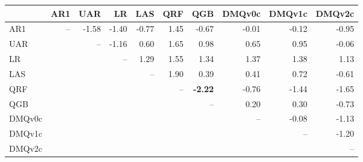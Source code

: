 \begin{tabular}{lrrrrrrrrr}
\toprule
 & AR1 & UAR & LR & LAS & QRF & QGB & DMQv0c & DMQv1c & DMQv2c \\
\midrule
AR1 & -- & -1.58 & -1.40 & -0.77 & 1.45 & -0.67 & -0.01 & -0.12 & -0.95 \\
UAR &  & -- & -1.16 & 0.60 & 1.65 & 0.98 & 0.65 & 0.95 & -0.06 \\
LR &  &  & -- & 1.29 & 1.55 & 1.34 & 1.37 & 1.38 & 1.13 \\
LAS &  &  &  & -- & 1.90 & 0.39 & 0.41 & 0.72 & -0.61 \\
QRF &  &  &  &  & -- & \textbf{-2.22} & -0.76 & -1.44 & -1.65 \\
QGB &  &  &  &  &  & -- & 0.20 & 0.30 & -0.73 \\
DMQv0c &  &  &  &  &  &  & -- & -0.08 & -1.13 \\
DMQv1c &  &  &  &  &  &  &  & -- & -1.20 \\
DMQv2c &  &  &  &  &  &  &  &  & -- \\
\bottomrule
\end{tabular}
